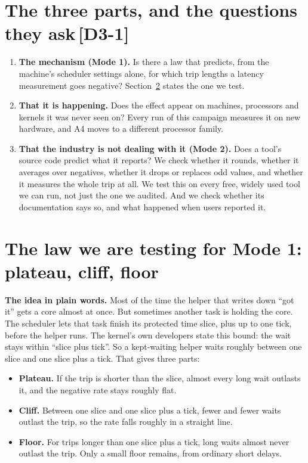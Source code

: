 \documentclass[11pt]{article}
\newcommand{\chgold}[1]{\,{\color{oldcol}\bfseries\footnotesize[#1]}}
\begin{document}
\section[The three parts, and the questions they ask]{The three parts, and the questions they ask\protect\chgold{D3-1}}
\begin{enumerate}
  \item \textbf{The mechanism (Mode 1).} Is there a law that predicts, from the machine's scheduler settings alone, for which trip lengths a latency measurement goes negative? Section~\ref{sec:law} states the one we test.
  \item \textbf{That it is happening.} Does the effect appear on machines, processors and kernels it was never seen on? Every run of this campaign measures it on new hardware, and A4 moves to a different processor family.
  \item \textbf{That the industry is not dealing with it (Mode 2).} Does a tool's source code predict what it reports? We check whether it rounds, whether it averages over negatives, whether it drops or replaces odd values, and whether it measures the whole trip at all. We test this on every free, widely used tool we can run, not just the one we audited. And we check whether its documentation says so, and what happened when users reported it.
\end{enumerate}

\section{The law we are testing for Mode 1: plateau, cliff, floor}\label{sec:law}

\textbf{The idea in plain words.} Most of the time the helper that writes down ``got it'' gets a core almost at once. But sometimes another task is holding the core. The scheduler lets that task finish its protected time slice, plus up to one tick, before the helper runs. The kernel's own developers state this bound: the wait stays within ``slice plus tick''. So a kept-waiting helper waits roughly between one slice and one slice plus a tick. That gives three parts:
\begin{itemize}
  \item \textbf{Plateau.} If the trip is shorter than the slice, almost every long wait outlasts it, and the negative rate stays roughly flat.
  \item \textbf{Cliff.} Between one slice and one slice plus a tick, fewer and fewer waits outlast the trip, so the rate falls roughly in a straight line.
  \item \textbf{Floor.} For trips longer than one slice plus a tick, long waits almost never outlast the trip. Only a small floor remains, from ordinary short delays.
\end{itemize}
\end{document}
